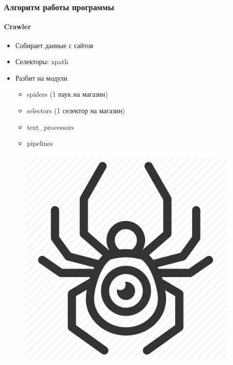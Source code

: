 \documentclass{beamer}
\begin{document}
\begin{frame}
    \frametitle{Алгоритм работы программы}
    \framesubtitle{Crawler}
    \begin{multicols}{2}
        \begin{itemize}
            \item Собирает данные с сайтов
            \item Селекторы: xpath
            \item Разбит на модули
                \begin{itemize}
                    \item spiders (1 паук на магазин)
                    \item selectors (1 селектор на магазин)
                    \item text\_processors
                    \item pipelines
                \end{itemize}
        \end{itemize}
        \bigskip
        \columnbreak
        \begin{figure}
            \includegraphics[width=0.8\columnwidth]{crawler.png}
        \end{figure}
    \end{multicols}
\end{frame}
\end{document}
